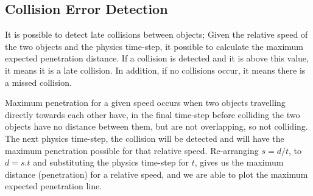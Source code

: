 \subsection{Collision Error Detection}
It is possible to detect late collisions between objects; Given the relative speed of the two objects and the physics time-step, it possible to calculate the maximum expected penetration distance. If a collision is detected and it is above this value, it means it is a late collision. In addition, if no collisions occur, it means there is a missed collision.

Maximum penetration for a given speed occurs when two objects travelling directly towards each other have, in the final time-step before colliding the two objects have no distance between them, but are not overlapping, so not colliding. The next physics time-step, the collision will be detected and will have the maximum penetration possible for that relative speed. Re-arranging $s=d/t$, to $d=s.t$ and substituting the physics time-step for $t$, gives us the maximum distance (penetration) for a relative speed, and we are able to plot the maximum expected penetration line.




